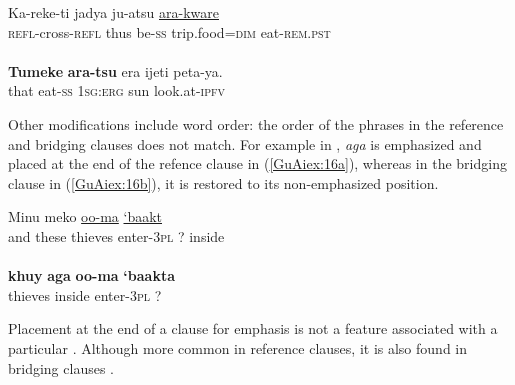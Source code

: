 \documentclass[output=paper]{LSP/langsci}
\begin{document}
\begin{exe}
\ex \label{GuAiex:15ab}
\begin{xlist}
\ex \label{GuAiex:15a}
\gll Ka-reke-ti      jadya   ju-atsu   \underline{}   \underline{ara-kware}\\
\textsc{refl}-cross-\textsc{refl}   thus   be-\textsc{ss}     trip.food=\textsc{dim}   eat-\textsc{rem.pst}\\
\glt {} \\
\ex \label{GuAiex:15b}
\gll \textbf{Tumeke} \textbf{ara-tsu} era     ijeti   peta-ya. \\
that     eat-\textsc{ss}     \textsc{1sg:erg}   sun   look.at-\textsc{ipfv}  \\
\glt {}
\end{xlist}
\end{exe}


Other modifications include word order: the order of the phrases in the reference and bridging clauses does not match. For example in , \textit{aga} is emphasized and placed at the end of the refence clause in (\ref{GuAiex:16a}), whereas in the bridging clause in (\ref{GuAiex:16b}), it is restored to its non-emphasized position.


\begin{exe}
\ex \label{GuAiex:16ab}
\begin{xlist}
\ex \label{GuAiex:16a}
\gll Minu   meko  \underline{}     \underline{oo-ma}     \underline{‘baakt}   \underline{}\\
and   these   thieves   enter-\textsc{3pl}   ?  inside\\
\glt {} \\
\ex \label{GuAiex:16b}
\gll \textbf{khuy}     \textbf{aga}     \textbf{oo-ma }    \textbf{‘baakta} \\
thieves   inside     enter-\textsc{3pl}   ? \\
\glt {}
\end{xlist}
\end{exe}

Placement at the end of a clause for emphasis is not a feature associated with a particular . Although more common in reference clauses, it is also found in bridging clauses \citep[][391]{schulze73}. 
\end{document}
